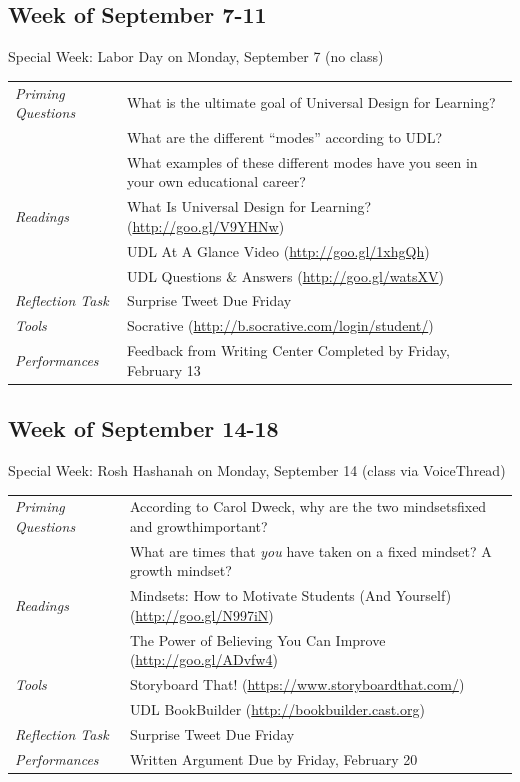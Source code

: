 \documentclass{tufte-handout}
\newcommand{\tabpq}{\faQuestionSign\medspace\textit{Priming Questions}}
\newcommand{\tabread}{\faBook\medspace\textit{Readings}}
\newcommand{\tabtools}{\faWrench\medspace\textit{Tools}}
\newcommand{\tabtweet}{\faLightbulb\medspace\textit{Reflection Task} & Surprise Tweet Due Friday \\}
\newcommand{\tabperformance}{\faTasks\medspace\textit{Performances}}
\newenvironment{tabsched}
	{\small
	\begin{tabular}{p{1.5in}p{4.5in}}
	\toprule}
	{\bottomrule
	\end{tabular}
	\normalsize}
\newenvironment{specweek}
	{\begin{center}
		\fontseries{b} \faBullhorn \medspace Special Week: }
		{\medspace \faBullhorn \fontseries{m}
	\end{center}}
\newcommand{\weekfour}{September 7-11}
\newcommand{\weekfive}{September 14-18}
\newcommand{\laborday}{Labor Day on Monday, September 7 (no class)}
\newcommand{\roshhashanah}{Rosh Hashanah on Monday, September 14 (class via VoiceThread)}
\begin{document}
\subsection{Week of \weekfour}

\begin{specweek}\laborday\end{specweek}

\begin{tabsched}
	\tabpq & What is the ultimate goal of Universal Design for Learning? \\
	& What are the different \enquote{modes} according to UDL? \\
	& What examples of these different modes have you seen in your own educational career? \\
	\midrule
	\tabread & What Is Universal Design for Learning? (\url{http://goo.gl/V9YHNw}) \\
	& UDL At A Glance Video (\url{http://goo.gl/1xhgQh}) \\
	& UDL Questions \& Answers (\url{http://goo.gl/watsXV}) \\
	\midrule
	\tabtweet
	\midrule
	\tabtools & Socrative (\url{http://b.socrative.com/login/student/}) \\
	\midrule
	\tabperformance & Feedback from Writing Center Completed by Friday, February 13 \\
\end{tabsched}
\newpage
\subsection{Week of \weekfive}

\begin{specweek}\roshhashanah\end{specweek}

\begin{tabsched}
	\tabpq & According to Carol Dweck, why are the two mindsets\textemdash{}fixed and growth\textemdash{}important? \\
	& What are times that \emph{you} have taken on a fixed mindset? A growth mindset? \\
	\midrule
	\tabread & Mindsets: How to Motivate Students (And Yourself) (\url{http://goo.gl/N997iN}) \\
	& The Power of Believing You Can Improve (\url{http://goo.gl/ADvfw4}) \\
	\midrule
	\tabtools & Storyboard That! (\url{https://www.storyboardthat.com/}) \\
	& UDL BookBuilder (\url{http://bookbuilder.cast.org}) \\
	\midrule
	\tabtweet
	\midrule
	\tabperformance & Written Argument Due by Friday, February 20 \\
\end{tabsched}
\end{document}
